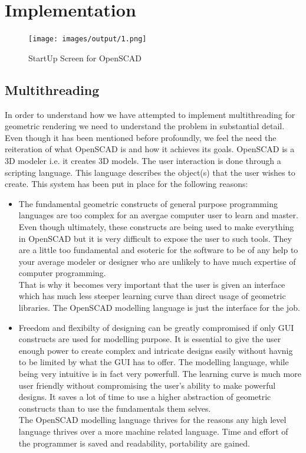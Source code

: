 \section{Implementation}
\begin{figure}[H]
    \centering \texttt{[image: images/output/1.png]}
    \caption{StartUp Screen for OpenSCAD}
    \label{fig:1}
\end{figure}
\subsection{Multithreading}
In order to understand how we have attempted to implement multithreading for geometric rendering we need to understand the problem in substantial detail.\\
Even though it has been mentioned before profoundly, we feel the need the reiteration of what OpenSCAD is and how it achieves its goals. OpenSCAD is a 3D modeler i.e. it creates 3D models. The user interaction is done through a scripting language. This language describes the object(s) that the user wishes to create. This system has been put in place for the following reasons:
\begin{itemize}
	\item The fundamental geometric constructs of general purpose programming languages are too complex for an avergae computer user to learn and master. Even though ultimately, these constructs are being used to make everything in OpenSCAD but it is very difficult to expose the user to such tools. They are a little too fundamental and esoteric for the software to be of any help to your average modeler or designer who are unlikely to have much expertise of computer programming.\\
	That is why it becomes very important that the user is given an interface which has much less steeper learning curve than direct usage of geometric libraries. The OpenSCAD modelling language is just the interface for the job.
	\item Freedom and flexibilty of designing can be greatly compromised if only GUI constructs are used for modelling purpose. It is essential to give the user enough power to create complex and intricate designs easily without havnig to be limited by what the GUI has to offer. The modelling language, while being very intuitive is in fact very powerfull. The learning curve is much more user friendly without compromising the user's ability to make powerful designs. It saves a lot of time to use a higher abstraction of geometric constructs than to use the fundamentals them selves.\\
	The OpenSCAD modelling language thrives for the reasons any high level language thrives over a more machine related language. Time and effort of the programmer is saved and readability, portability are gained.
\end{itemize}
